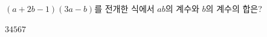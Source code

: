 $(a+2b-1)(3a-b)$를 전개한 식에서 $ab$의 계수와 $b$의 계수의 합은?
\begin{choices32}{$3$}{$4$}{$5$}{$6$}{$7$}\end{choices32}
